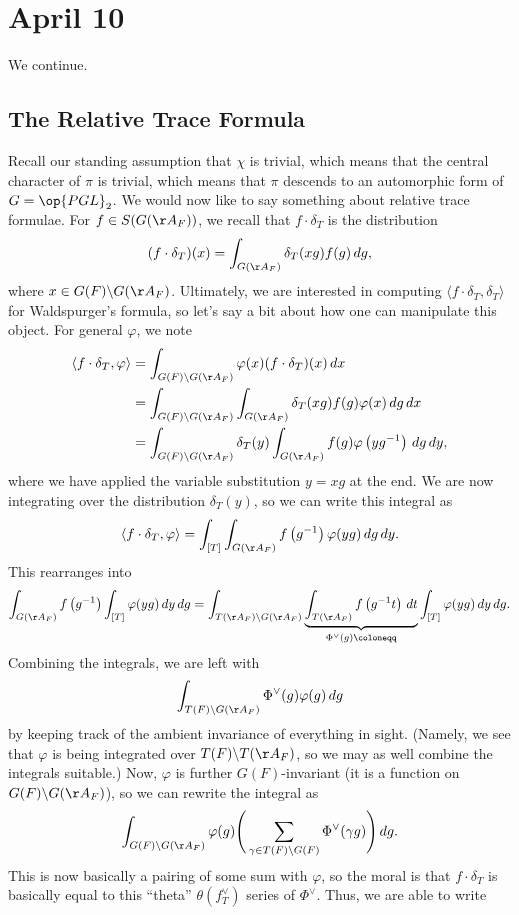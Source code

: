 \documentclass[../notes.tex]{subfiles}
\begin{document}
\section{April 10}
We continue.

\subsection{The Relative Trace Formula}
Recall our standing assumption that $\chi$ is trivial, which means that the central character of $\pi$ is trivial, which means that $\pi$ descends to an automorphic form of $G=\op{PGL}_2$. We would now like to say something about relative trace formulae. For $f\in S(G(\AA_F))$, we recall that $f\cdot\delta_T$ is the distribution
\[(f\cdot\delta_T)(x)=\int_{G(\AA_F)}\delta_T(xg)f(g)\,dg,\]
where $x\in G(F)\backslash G(\AA_F)$. Ultimately, we are interested in computing $\langle f\cdot\delta_T,\delta_T\rangle$ for Waldspurger's formula, so let's say a bit about how one can manipulate this object. For general $\varphi$, we note
\begin{align*}
	\langle f\cdot\delta_T,\varphi\rangle &= \int_{G(F)\backslash G(\AA_F)}\varphi(x)(f\cdot\delta_T)(x)\,dx \\
	&= \int_{G(F)\backslash G(\AA_F)}\int_{G(\AA_F)}\delta_T(xg)f(g)\varphi(x)\,dg\,dx \\
	&= \int_{G(F)\backslash G(\AA_F)}\delta_T(y)\int_{G(\AA_F)}f(g)\varphi\left(yg^{-1}\right)\,dg\,dy,
\end{align*}
where we have applied the variable substitution $y=xg$ at the end. We are now integrating over the distribution $\delta_T(y)$, so we can write this integral as
\[\langle f\cdot\delta_T,\varphi\rangle=\int_{[T]}\int_{G(\AA_F)}f\left(g^{-1}\right)\varphi(yg)\,dg\,dy.\]
This rearranges into
\[\int_{G(\AA_F)}f\left(g^{-1}\right)\int_{[T]}\varphi(yg)\,dy\,dg=\int_{T(\AA_F)\backslash G(\AA_F)}\underbrace{\int_{T(\AA_F)}f\left(g^{-1}t\right)\,dt}_{\Phi^\lor(g)\coloneqq}\int_{[T]}\varphi(yg)\,dy\,dg.\]
Combining the integrals, we are left with
\[\int_{T(F)\backslash G(\AA_F)}\Phi^\lor(g)\varphi(g)\,dg\]
by keeping track of the ambient invariance of everything in sight. (Namely, we see that $\varphi$ is being integrated over $T(F)\backslash T(\AA_F)$, so we may as well combine the integrals suitable.) Now, $\varphi$ is further $G(F)$-invariant (it is a function on $G(F)\backslash G(\AA_F)$), so we can rewrite the integral as
\[\int_{G(F)\backslash G(\AA_F)}\varphi(g)\Bigg(\sum_{\gamma\in T(F)\backslash G(F)}\Phi^\lor(\gamma g)\Bigg)\,dg.\]
This is now basically a pairing of some sum with $\varphi$, so the moral is that $f\cdot\delta_T$ is basically equal to this ``theta'' $\theta(f_T^\lor)$ series of $\Phi^\lor$. Thus, we are able to write
\end{document}
